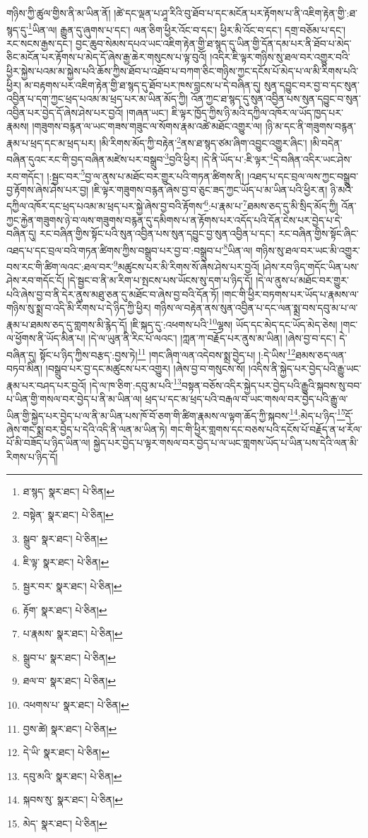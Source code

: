 གཉིས་ཀྱི་ཚུལ་གྱིས་ནི་མ་ཡིན་ནོ། །ཚེ་དང་ལྡན་པ་ཤཱ་རིའི་བུ་ཐོབ་པ་དང་མངོན་པར་རྟོགས་པ་ནི་འཇིག་རྟེན་གྱི་:ཐ་སྙད་དུ་\footnote{ཐ་སྙད་  སྣར་ཐང་།  པེ་ཅིན། }ཡིན་ལ། རྒྱུན་དུ་ཞུགས་པ་དང་། ལན་ཅིག་ཕྱིར་འོང་བ་དང་། ཕྱིར་མི་འོང་བ་དང་། དགྲ་བཅོམ་པ་དང་། རང་སངས་རྒྱས་དང་། བྱང་ཆུབ་སེམས་དཔའ་ཡང་འཇིག་རྟེན་གྱི་ཐ་སྙད་དུ་ཡིན་གྱི་དོན་དམ་པར་ནི་ཐོབ་པ་མེད་ཅིང་མངོན་པར་རྟོགས་པ་མེད་དོ་ཞེས་རྒྱ་ཆེར་གསུངས་པ་ལྟ་བུའོ། །འདིར་ཇི་ལྟར་གཉིས་སུ་ཐལ་བར་འགྱུར་བའི་ཕྱིར་སྐྱེས་པའམ་མ་སྐྱེས་པའི་ཆོས་ཀྱིས་ཐོབ་པ་འཐོབ་པ་བཀག་ཅིང་གཉིས་ཀྱང་དངོས་པོ་མེད་པ་ལ་མི་རིགས་པའི་ཕྱིར། མ་བརྟགས་པར་འཇིག་རྟེན་གྱི་ཐ་སྙད་དུ་ཐོབ་པར་ཁས་བླངས་པ་དེ་བཞིན་དུ། སུན་དབྱུང་བར་བྱ་བ་དང་སུན་འབྱིན་པ་དག་ཀྱང་ཕྲད་པའམ་མ་ཕྲད་པར་མ་ཡིན་མོད་ཀྱི། འོན་ཀྱང་ཐ་སྙད་དུ་སུན་འབྱིན་པས་སུན་དབྱུང་བ་སུན་འབྱིན་པར་བྱེད་དོ་ཞེས་ཤེས་པར་བྱའོ། །གཞན་ཡང་། ཇི་ལྟར་ཁྱོད་ཀྱིས་ཉི་མའི་དཀྱིལ་འཁོར་ལ་ཡོད་ཁྱད་པར་རྣམས། །གཟུགས་བརྙན་ལ་ཡང་གཟས་གཟུང་ལ་སོགས་རྣམ་འཚེ་མཐོང་འགྱུར་ལ། །ཉི་མ་དང་ནི་གཟུགས་བརྙན་རྣམ་པ་ཕྲད་དང་མ་ཕྲད་པར། །མི་རིགས་མོད་ཀྱི་བརྟེན་\footnote{བསྟེན་  སྣར་ཐང་།  པེ་ཅིན། }ནས་ཐ་སྙད་ཙམ་ཞིག་འབྱུང་འགྱུར་ཞིང་། །མི་བདེན་བཞིན་དུའང་རང་གི་བྱད་བཞིན་མཛེས་པར་བསྒྲུབ་\footnote{སྒྲུབ་  སྣར་ཐང་།  པེ་ཅིན། }བྱའི་ཕྱིར། །དེ་ནི་ཡོད་པ་:ཇི་ལྟར་\footnote{ཇི་ལྟ་  སྣར་ཐང་།  པེ་ཅིན། }དེ་བཞིན་འདིར་ཡང་ཤེས་རབ་གདོང་། །:སྦྱང་བར་\footnote{སྦྱར་བར་  སྣར་ཐང་།  པེ་ཅིན། }བྱ་ལ་ནུས་པ་མཐོང་བར་གྱུར་པའི་གཏན་ཚིགས་ནི། །འཐད་པ་དང་བྲལ་ལས་ཀྱང་བསྒྲུབ་བྱ་རྟོགས་ཞེས་ཤེས་པར་བྱ། །ཇི་ལྟར་གཟུགས་བརྙན་ཞེས་བྱ་བ་ཅུང་ཟད་ཀྱང་ཡོད་པ་མ་ཡིན་པའི་ཕྱིར་ན། ཉི་མའི་དཀྱིལ་འཁོར་དང་ཕྲད་པའམ་མ་ཕྲད་པར་སྐྱེ་ཞེས་བྱ་བའི་རྟོགས་\footnote{རྟོག་  སྣར་ཐང་།  པེ་ཅིན། }:པ་རྣམ་པ་\footnote{པ་རྣམས་  སྣར་ཐང་།  པེ་ཅིན། }ཐམས་ཅད་དུ་མི་སྲིད་མོད་ཀྱི། འོན་ཀྱང་རྐྱེན་གཟུགས་ཉེ་བ་ལས་གཟུགས་བརྙན་དུ་དམིགས་པ་ན་རྟོགས་པར་འདོད་པའི་དོན་ངེས་པར་བྱེད་པ་དེ་བཞིན་དུ། རང་བཞིན་གྱིས་སྟོང་པའི་སུན་འབྱིན་པས་སུན་དབྱུང་བྱ་སུན་འབྱིན་པ་དང་། རང་བཞིན་གྱིས་སྟོང་ཞིང་འཐད་པ་དང་བྲལ་བའི་གཏན་ཚིགས་ཀྱིས་བསྒྲུབ་པར་བྱ་བ་:བསྒྲུབ་པ་\footnote{སྒྲུབ་པ་  སྣར་ཐང་།  པེ་ཅིན། }ཡིན་ལ། གཉིས་སུ་ཐལ་བར་ཡང་མི་འགྱུར་བས་རང་གི་ཚིག་ལའང་:ཐལ་བར་\footnote{ཐལ་བ་  སྣར་ཐང་།  པེ་ཅིན། }མཚུངས་པར་མི་རིགས་སོ་ཞེས་ཤེས་པར་བྱའོ། །ཤེས་རབ་ཉིད་གདོང་ཡིན་པས་ཤེས་རབ་གདོང་ངོ། །དེ་སྦྱང་བ་ནི་མ་རིག་པ་སྤངས་པས་ཡོངས་སུ་དག་པ་ཉིད་དོ། །དེ་ལ་ནུས་པ་མཐོང་བར་གྱུར་པའི་ཞེས་བྱ་བ་ནི་དེར་ནུས་མཐུ་ཅན་དུ་མཐོང་བ་ཞེས་བྱ་བའི་དོན་ཏོ། །གང་གི་ཕྱིར་བཏགས་པར་ཡོད་པ་རྣམས་ལ་གཉིས་སུ་སྨྲ་བ་འདི་མི་རིགས་པ་དེ་ཉིད་ཀྱི་ཕྱིར། གཉིས་ལ་བརྟེན་ནས་སུན་འབྱིན་པ་དང་ལན་སྨྲ་བས་དབུ་མ་པ་ལ་རྣམ་པ་ཐམས་ཅད་དུ་གླགས་མི་རྙེད་དོ། །ཇི་སྐད་དུ་:འཕགས་པའི་\footnote{འཕགས་པ་  སྣར་ཐང་།  པེ་ཅིན། }ལྷས། ཡོད་དང་མེད་དང་ཡོད་མེད་ཅེས། །གང་ལ་ཕྱོགས་ནི་ཡོད་མིན་པ། །དེ་ལ་ཡུན་ནི་རིང་པོ་ལའང་། །ཀླན་ཀ་བརྗོད་པར་ནུས་མ་ཡིན། །ཞེས་བྱ་བ་དང་། དེ་བཞིན་དུ། སྟོང་པ་ཉིད་ཀྱིས་བརྩད་:བྱས་ཏེ།\footnote{བྱས་ཚེ།  སྣར་ཐང་།  པེ་ཅིན། } །གང་ཞིག་ལན་འདེབས་སྨྲ་བྱེད་པ། །:དེ་ཡིས་\footnote{དེ་ཡི་  སྣར་ཐང་།  པེ་ཅིན། }ཐམས་ཅད་ལན་བཏབ་མིན། །བསྒྲུབ་པར་བྱ་དང་མཚུངས་པར་འགྱུར། །ཞེས་བྱ་བ་གསུངས་སོ། །འདིས་ནི་སྐྱེད་པར་བྱེད་པའི་རྒྱུ་ཡང་རྣམ་པར་བཤད་པར་བྱའོ། །དེ་ལ་ཁ་ཅིག་:དབུ་མ་པའི་\footnote{དབུ་མའི་  སྣར་ཐང་།  པེ་ཅིན། }བསྟན་བཅོས་འདིར་སྐྱེད་པར་བྱེད་པའི་རྒྱུའི་སྐབས་སུ་བབ་པ་ཡིན་གྱི་གསལ་བར་བྱེད་པ་ནི་མ་ཡིན་ལ། ཕྲད་པ་དང་མ་ཕྲད་པའི་བརྒལ་བ་ཡང་གསལ་བར་བྱེད་པའི་རྒྱུ་ལ་ཡིན་གྱི་སྐྱེད་པར་བྱེད་པ་ལ་ནི་མ་ཡིན་པས་ཁོ་བོ་ཅག་གི་ཚིག་རྣམས་ལ་ལྟག་ཆོད་ཀྱི་སྐབས་\footnote{སྐབས་སུ་  སྣར་ཐང་།  པེ་ཅིན། }:མེད་པ་ཉིད་\footnote{མེད་  སྣར་ཐང་།  པེ་ཅིན། }དོ་ཞེས་གང་སྨྲ་བར་བྱེད་པ་དེའི་འདི་ནི་ལན་མ་ཡིན་ཏེ། གང་གི་ཕྱིར་གླགས་དང་བཅས་པའི་དངོས་པོ་བརྗོད་ན་ཕ་རོལ་པོ་མི་བཟོད་པ་ཉིད་ཡིན་ལ། སྐྱེད་པར་བྱེད་པ་ལྟར་གསལ་བར་བྱེད་པ་ལ་ཡང་གླགས་ཡོད་པ་ཡིན་པས་དེའི་ལན་མི་རིགས་པ་ཉིད་དོ། 